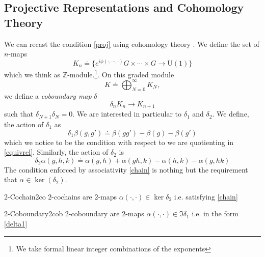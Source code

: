 \documentclass[11pt]{article}
\theoremstyle{definition}
\numberwithin{equation}{section}
\newcommand*\U{\mathrm{U}}
\begin{document}
\subsection{Projective Representations and Cohomology Theory}
We can recast the condition \eqref{proj} using cohomology theory \cite{Tachikawa:2017gyf}. We define the set of $n$-maps
\begin{equation}
    K_n \doteq \{e^{i\phi(\cdot, \cdots, \cdot)} G \times \cdots \times G \to \U(1)\}
\end{equation} 
which we think as $\mathbb{Z}$-module.\footnote{We take formal linear integer combinations of the exponents}. On this graded module 
\begin{equation}
	K \doteq \bigoplus_{N=0}^{\infty} K_N,
\end{equation}
we define a \textit{coboundary map} $\delta$
\begin{equation}
    \delta_n  K_n \to K_{n+1}
\end{equation}
such that $\delta_{N+1}  \delta_N = 0$. We are interested in particular to $\delta_1$ and $\delta_2$. We define, the action of $\delta_1$ as
\begin{equation}\label{delta1}
    \delta_1 \beta(g,g') \doteq \beta(gg') -\beta(g) -\beta(g')
\end{equation}
which we notice to be the condition with respect to we are quotienting in \eqref{equivrel}. Similarly, the action of $\delta_2$ is
\begin{equation}
    \delta_2 \alpha(g,h,k) \doteq \alpha(g,h) + \alpha(gh,k) - \alpha(h,k) -\alpha(g,hk)
\end{equation}
The condition enforced by associativity \eqref{chain} is nothing but the requirement that $\alpha \in \ker(\delta_2)$. 

\begin{defn}{2-Cochain}{2co}
	$2$-cochains are $2$-maps $\alpha(\cdot, \cdot) \in \ker \delta_2$ i.e. satisfying \eqref{chain} 
\end{defn}
\begin{defn}{2-Coboundary}{2cob}
	$2$-coboundary are $2$-maps $\alpha(\cdot, \cdot) \in \Im \delta_1$ i.e. in the form \eqref{delta1}\\
\end{defn}
\end{document}
